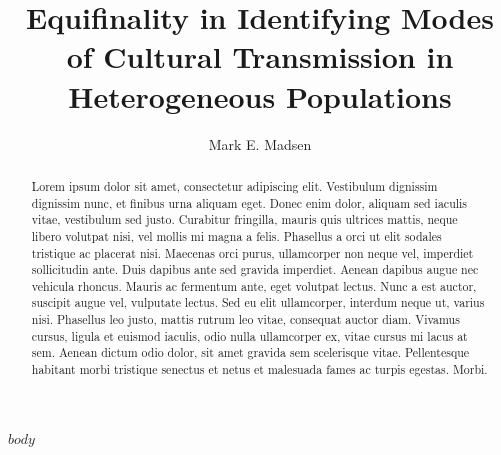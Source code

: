 \documentclass[reprint,titlepage,authoryear,12pt]{elsarticle}
\def\doctitle{Equifinality in Identifying Modes of Cultural Transmission in Heterogeneous Populations}
\begin{document}
\newtheorem{resquestion}{Research Question}



\begin{frontmatter}


\title{\doctitle{}}


\author{Mark E. Madsen}

\address{Department of Anthropology, Box 353100, University of Washington, Seattle WA, 98195 USA}

\begin{abstract}
Lorem ipsum dolor sit amet, consectetur adipiscing elit. Vestibulum dignissim dignissim nunc, et finibus urna aliquam eget. Donec enim dolor, aliquam sed iaculis vitae, vestibulum sed justo. Curabitur fringilla, mauris quis ultrices mattis, neque libero volutpat nisi, vel mollis mi magna a felis. Phasellus a orci ut elit sodales tristique ac placerat nisi. Maecenas orci purus, ullamcorper non neque vel, imperdiet sollicitudin ante. Duis dapibus ante sed gravida imperdiet. Aenean dapibus augue nec vehicula rhoncus. Mauris ac fermentum ante, eget volutpat lectus. Nunc a est auctor, suscipit augue vel, vulputate lectus. Sed eu elit ullamcorper, interdum neque ut, varius nisi. Phasellus leo justo, mattis rutrum leo vitae, consequat auctor diam. Vivamus cursus, ligula et euismod iaculis, odio nulla ullamcorper ex, vitae cursus mi lacus at sem. Aenean dictum odio dolor, sit amet gravida sem scelerisque vitae. Pellentesque habitant morbi tristique senectus et netus et malesuada fames ac turpis egestas. Morbi.\end{abstract}








\end{frontmatter}

\clearpage
%



$body$


\end{document}
